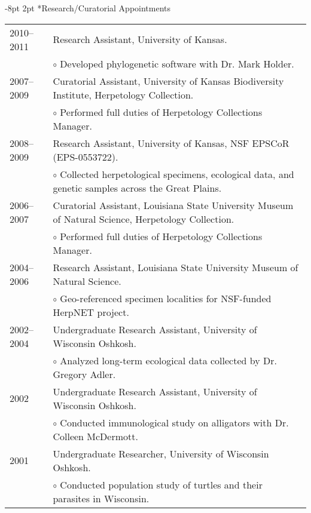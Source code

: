 \documentclass[10pt]{article}
\makeatletter
\renewcommand{\section}{\@startsection{section}{1}{0mm}%
    {-8pt}%
    {2pt}%
   {\bfseries\large}}
\makeatother
\begin{document}
\section*{Research/Curatorial Appointments}
\noindent\begin{tabulary}{\textwidth}{ @{} l L @{} }
2010--2011	& Research Assistant, University of Kansas. \\
			& \addtolength{\leftskip}{4mm} $\circ$ Developed phylogenetic software with Dr. Mark Holder. \\
2007--2009	& Curatorial Assistant, University of Kansas Biodiversity Institute, Herpetology Collection. \\
			& \addtolength{\leftskip}{4mm} $\circ$ Performed full duties of Herpetology Collections Manager. \\
2008--2009	& Research Assistant, University of Kansas, NSF EPSCoR (EPS-0553722). \\
			& \addtolength{\leftskip}{4mm} $\circ$ Collected herpetological specimens, ecological data, and genetic samples across the Great Plains. \\
2006--2007	& Curatorial Assistant, Louisiana State University Museum of Natural Science, Herpetology Collection. \\
			& \addtolength{\leftskip}{4mm} $\circ$ Performed full duties of Herpetology Collections Manager. \\
2004--2006	& Research Assistant, Louisiana State University Museum of Natural Science. \\
			& \addtolength{\leftskip}{4mm} $\circ$ Geo-referenced specimen localities for NSF-funded HerpNET project. \\
2002--2004	& Undergraduate Research Assistant, University of Wisconsin Oshkosh. \\
			& \addtolength{\leftskip}{4mm} $\circ$ Analyzed long-term ecological data collected by Dr. Gregory Adler. \\
2002			& Undergraduate Research Assistant, University of Wisconsin Oshkosh. \\
			& \addtolength{\leftskip}{4mm} $\circ$ Conducted immunological study on alligators with Dr. Colleen McDermott. \\
2001			& Undergraduate Researcher, University of Wisconsin Oshkosh. \\
			& \addtolength{\leftskip}{4mm} $\circ$ Conducted population study of turtles and their parasites in Wisconsin. \\
\end{tabulary}
\end{document}
